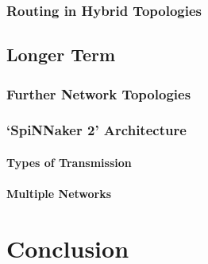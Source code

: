 \documentclass[a4paper,12pt,titlepage]{report}
\begin{document}
			\subsection{Routing in Hybrid Topologies}
		
		\section{Longer Term}
			
			\subsection{Further Network Topologies}
			
			\subsection{`SpiNNaker 2' Architecture}
				
				\subsubsection{Types of Transmission}
				
				\subsubsection{Multiple Networks}
	
	
	\chapter{Conclusion}
	
\end{document}
